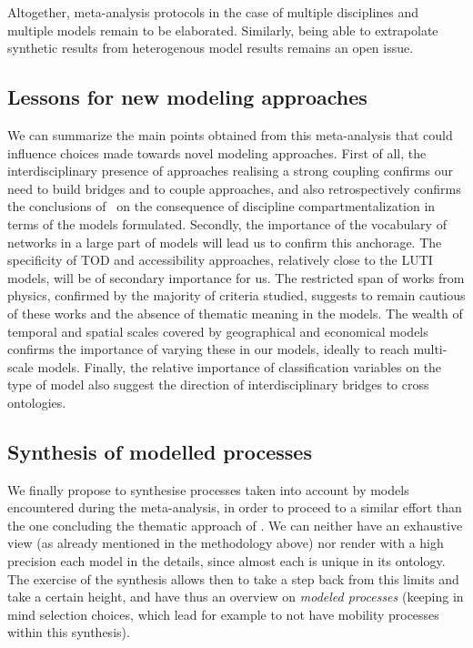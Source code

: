 \documentclass[10pt]{article}
\begin{document}
Altogether, meta-analysis protocols in the case of multiple disciplines and multiple models remain to be elaborated. Similarly, being able to extrapolate synthetic results from heterogenous model results remains an open issue.


\subsection{Lessons for new modeling approaches}


We can summarize the main points obtained from this meta-analysis that could influence choices made towards novel modeling approaches. First of all, the interdisciplinary presence of approaches realising a strong coupling confirms our need to build bridges and to couple approaches, and also retrospectively confirms the conclusions of~\cite{raimbault2018caracterisation} on the consequence of discipline compartmentalization in terms of the models formulated. Secondly, the importance of the vocabulary of networks in a large part of models will lead us to confirm this anchorage. The specificity of TOD and accessibility approaches, relatively close to the LUTI models, will be of secondary importance for us. The restricted span of works from physics, confirmed by the majority of criteria studied, suggests to remain cautious of these works and the absence of thematic meaning in the models. The wealth of temporal and spatial scales covered by geographical and economical models confirms the importance of varying these in our models, ideally to reach multi-scale models. Finally, the relative importance of classification variables on the type of model also suggest the direction of interdisciplinary bridges to cross ontologies.

\subsection{Synthesis of modelled processes}

We finally propose to synthesise processes taken into account by models encountered during the meta-analysis, in order to proceed to a similar effort than the one concluding the thematic approach of \cite{raimbault2018caracterisation}. We can neither have an exhaustive view (as already mentioned in the methodology above) nor render with a high precision each model in the details, since almost each is unique in its ontology. The exercise of the synthesis allows then to take a step back from this limits and take a certain height, and have thus an overview on \emph{modeled processes} (keeping in mind selection choices, which lead for example to not have mobility processes within this synthesis).
\end{document}
